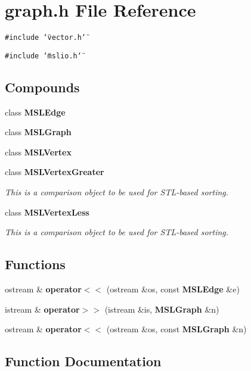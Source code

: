 \section{graph.h File Reference}
\label{graph_8h}
{\tt \#include \char`\"{}vector.h\char`\"{}}\par
{\tt \#include \char`\"{}mslio.h\char`\"{}}\par
\subsection*{Compounds}
\begin{CompactItemize}
\item 
class {\bf MSLEdge}
\item 
class {\bf MSLGraph}
\item 
class {\bf MSLVertex}
\item 
class {\bf MSLVertex\-Greater}
\begin{CompactList}\small\item\em This is a comparison object to be used for STL-based sorting.\item\end{CompactList}\item 
class {\bf MSLVertex\-Less}
\begin{CompactList}\small\item\em This is a comparison object to be used for STL-based sorting.\item\end{CompactList}\end{CompactItemize}
\subsection*{Functions}
\begin{CompactItemize}
\item 
ostream \& {\bf operator$<$$<$} (ostream \&os, const {\bf MSLEdge} \&e)
\item 
istream \& {\bf operator$>$$>$} (istream \&is, {\bf MSLGraph} \&n)
\item 
ostream \& {\bf operator$<$$<$} (ostream \&os, const {\bf MSLGraph} \&n)
\end{CompactItemize}


\subsection{Function Documentation}
